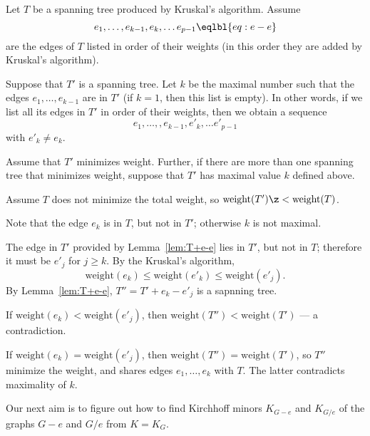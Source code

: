 Let $T$ be a spanning tree produced by Kruskal’s algorithm.
Assume 
\[e_1,\dots,e_{k-1},e_k,\dots e_{p-1}\eqlbl{eq:e-e}\] 
are the edges of $T$ listed in order of their weights
(in this order they are added by Kruskal’s algorithm).

Suppose that $T'$ is a spanning tree.
Let $k$ be the maximal number such that the edges  $e_1,\dots,e_{k-1}$ are in $T'$ (if $k=1$, then this list is empty). 
In other words, if we list all its edges in $T'$ in order of their weights, then 
we obtain a sequence 
\[e_1,\dots,,e_{k-1},e'_k,\dots e'_{p-1}\]
with $e'_k\ne e_k$.

Assume that $T'$ minimizes weight.
Further, if there are more than one spanning tree that minimizes weight, suppose that $T'$ has maximal value $k$ defined above.

Assume $T$ does not minimize the total weight, so $\mathrm{weight}(T')\z< \mathrm{weight}(T)$.

Note that the edge $e_k$ is in $T$, but not in $T'$; otherwise $k$ is not maximal.

The edge in $T'$ provided by Lemma~\ref{lem:T+e-e} lies in $T'$, but not in $T$;
therefore it must be $e'_j$ for $j\ge k$.
By the Kruskal’s algorithm,
\[\mathrm{weight}(e_k)\le \mathrm{weight}(e'_k)\le \mathrm{weight}(e'_j).\]
By Lemma~\ref{lem:T+e-e}, $T''=T'+e_k-e'_j$ is a sapnning tree.

If $\mathrm{weight}(e_k)< \mathrm{weight}(e'_j)$, then $\mathrm{weight}(T'')<\mathrm{weight}(T')$ --- a contradiction.

If $\mathrm{weight}(e_k)=\mathrm{weight}(e'_j)$, then $\mathrm{weight}(T'')=\mathrm{weight}(T')$, so $T''$ minimize the weight, and shares edges $e_1,\dots,e_k$ with $T$.
The latter contradicts maximality of $k$.
\qeds































Our next aim is to figure out how to find Kirchhoff minors $K_{G- e}$ and $K_{G/e}$ of the graphs $G- e$ and $G/e$ from $K=K_G$.



